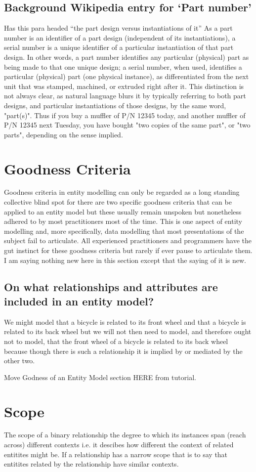 \subsection{Background Wikipedia entry for `Part number'}
Has this para headed ``the part design versus instantiations of it''
As a part number is an identifier of a part design (independent of its instantiations), a serial number is a unique identifier of a particular instantiation of that part design. In other words, a part number identifies any particular (physical) part as being made to that one unique design; a serial number, when used, identifies a particular (physical) part (one physical instance), as differentiated from the next unit that was stamped, machined, or extruded right after it. This distinction is not always clear, as natural language blurs it by typically referring to both part designs, and particular instantiations of those designs, by the same word, "part(s)". Thus if you buy a muffler of P/N 12345 today, and another muffler of P/N 12345 next Tuesday, you have bought "two copies of the same part", or "two parts", depending on the sense implied.

\section{Goodness Criteria}
 Goodness criteria in entity modelling  can only be regarded as a long standing collective blind spot for  
there are two specific goodness criteria that can be  applied to an entity model but these  usually remain unspoken but 
nonetheless  adhered to by most practitioners most of the time. This is one aspect of entity modelling and, more specifically, data modelling that most presentations of the subject fail to articulate.  
All experienced practitioners and programmers have the gut instinct for these 
 goodness criteria but rarely if ever pause to articulate them.  
 I am saying nothing new here in this section except that the saying of it is new. 

\subsection{On what relationships and attributes are included in an entity model?}
\mynote We might model that a bicycle is related to its front wheel and that a bicycle is related to its back wheel but we will not then need to model,  and therefore ought not to model, that the front wheel of a bicycle is related to its back wheel because though there is such a relationship it is implied by or mediated by the other two. 

Move Godness of an Entity Model section HERE from tutorial. 

\section{Scope}
The scope of a binary relationship the degree to which its instances span (reach across) different contexts i.e. it descibes how different the context of related entitites might be. If a relationship has a narrow scope that is to say that entitites related by the relationship have similar contexts. 

